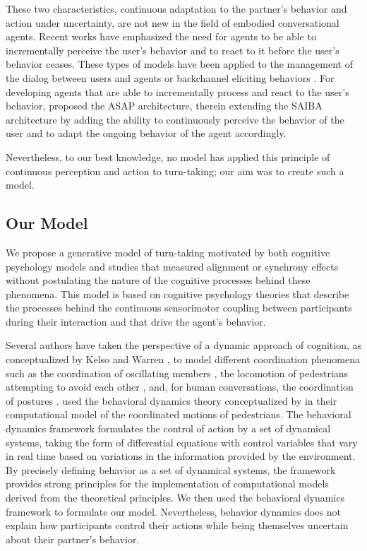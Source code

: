 \documentclass[twocolumn]{svjour3}
\begin{document}
 These two characteristics, continuous adaptation to the partner's behavior and action under uncertainty, are not new in the field of embodied conversational agents. Recent works have emphasized the need for agents  to be able to incrementally perceive the user's behavior and to react to it before the user's behavior ceases. These types of models have been applied to the management of the dialog between users and agents \cite{skantze_towards_2010} or backchannel eliciting behaviors \cite{buschmeier_when_2014}. For developing agents that are able to incrementally process and react to the user's behavior, \cite{kopp_architecture_2014} proposed the ASAP architecture, therein extending the SAIBA architecture by adding the ability to continuously perceive the behavior of the user and to adapt the ongoing behavior of the agent accordingly. 
 
 Nevertheless, to our best knowledge, no model has applied this principle of continuous perception and action to turn-taking; our aim was to create such a model. 

\subsection{Our Model}

We propose a generative model of turn-taking motivated  by both cognitive psychology models and studies
that measured alignment or synchrony effects without postulating the nature of the cognitive processes
behind these phenomena. This model is based on cognitive psychology theories that describe the
processes behind the continuous sensorimotor coupling between participants during their interaction and that
drive the agent's behavior.

Several authors have taken the perspective of a dynamic approach of cognition, as conceptualized by Kelso \cite{kelso_coordination_2009} and Warren \citep{warren_dynamics_2006}, to model different coordination phenomena such as 
the coordination of oscillating members \citep{haken_theoretical_1985}, 
the locomotion of pedestrians attempting to avoid each other \citep{rio_follow_2014}, and, 
for human conversations, the coordination of postures \citep{fowler_language_2008}.
\citep{rio_follow_2014} used the behavioral dynamics theory conceptualized by \citep{warren_dynamics_2006} in their computational model of the coordinated motions of pedestrians. The behavioral dynamics framework formulates the control of action by a set of dynamical systems, taking the form of differential equations with control variables that vary in real time based on variations in the information provided by the environment.
By precisely defining behavior as a set of dynamical systems, the framework provides strong principles for the
implementation of computational models derived from the theoretical principles. 
We then used the behavioral dynamics framework to formulate our model. 
Nevertheless, behavior dynamics does not explain how participants control 
their actions while being themselves uncertain about their partner's behavior. 
\end{document}
